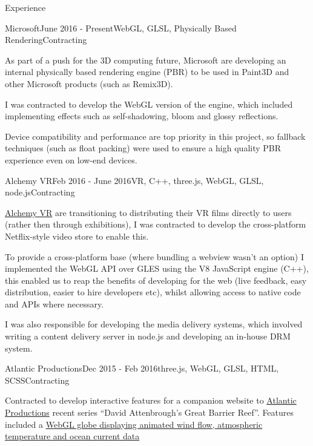 \documentclass{resume} %
\begin{document}
\begin{rSection}{Experience}

\begin{rSubsection}{Microsoft}{June 2016 - Present}{WebGL, GLSL, Physically Based Rendering}{Contracting}
\item As part of a push for the 3D computing future, Microsoft are developing an internal physically based rendering engine (PBR) to be used in Paint3D and other Microsoft products (such as Remix3D).
\item I was contracted to develop the WebGL version of the engine, which included implementing effects such as self-shadowing, bloom and glossy reflections.
\item Device compatibility and performance are top priority in this project, so fallback techniques (such as float packing) were used to ensure a high quality PBR experience even on low-end devices.
\end{rSubsection}

\begin{rSubsection}{Alchemy VR}{Feb 2016 - June 2016}{VR, C++, three.js, WebGL, GLSL, node.js}{Contracting}
\item \href{http://www.alchemyvr.com/}{Alchemy VR} are transitioning to distributing their VR films directly to users (rather then through exhibitions), I was contracted to develop the cross-platform Netflix-style video store to enable this.
\item To provide a cross-platform base (where bundling a webview wasn't an option) I implemented the WebGL API over GLES using the V8 JavaScript engine (C++), this enabled us to reap the benefits of developing for the web (live feedback, easy distribution, easier to hire developers etc), whilst allowing access to native code and APIs where necessary.
\item I was also responsible for developing the media delivery systems, which involved writing a content delivery server in node.js and developing an in-house DRM system.
\end{rSubsection}

\begin{rSubsection}{Atlantic Productions}{Dec 2015 - Feb 2016}{three.js, WebGL, GLSL, HTML, SCSS}{Contracting}
\item Contracted to develop interactive features for a companion website to \href{http://www.atlanticproductions.tv/}{Atlantic Productions} recent series ``David Attenbrough's Great Barrier Reef''. Features included a \href{http://attenboroughsreef.com/_mobile/interactive_weather_globe.php}{WebGL globe displaying animated wind flow, atmospheric temperature and ocean current data}
\end{rSubsection}


\end{rSection}
\end{document}
